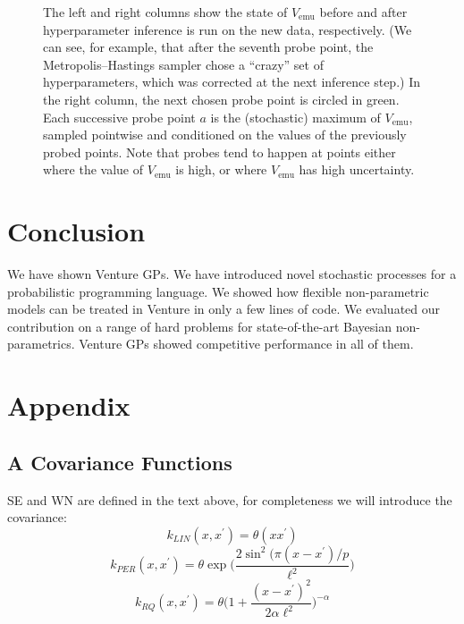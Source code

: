 \documentclass{article} %
\newcommand{\emu}{{\textrm{emu}}}
\begin{document}
\begin{figure}
{      The left and right columns show the state of $V_\emu$ before and after hyperparameter inference is run on the new data, respectively.
      (We can see, for example, that after the seventh probe point, the Metropolis--Hastings sampler chose a ``crazy'' set of hyperparameters, which was corrected at the next inference step.)
      In the right column, the next chosen probe point is circled in green.
      Each successive probe point $a$ is the (stochastic) maximum of $V_\emu$, sampled pointwise and conditioned on the values of the previously probed points.
      Note that probes tend to happen at points either where the value of $V_\emu$ is high, or where $V_\emu$ has high uncertainty.
      }
    \label{fig:bayesopt-sequence}
\end{figure}




\FloatBarrier
\section{Conclusion}
We have shown Venture GPs. We have introduced novel stochastic processes for a probabilistic programming language. We showed how flexible non-parametric models can be treated in Venture in only a few lines of code. We evaluated our contribution on a range of hard problems for state-of-the-art Bayesian non-parametrics. Venture GPs showed competitive performance in all of them. 

\section*{Appendix}
\subsection*{A Covariance Functions}
SE and WN are defined in the text above, for completeness we will introduce the covariance:
\begin{equation}
k_{LIN}(x,x^\prime) = \theta (x x^\prime) 
\end{equation}
\begin{equation}
k_{PER}(x,x^\prime) = \theta \exp \bigg( \frac{2 \sin^2 ( \pi (x - x^\prime)/p}{\ell^2} \bigg) 
\end{equation}
\begin{equation}
k_{RQ}(x,x^\prime) =   \theta \bigg(1 + \frac{(x - x^\prime)^2}{2 \alpha \ell^2} \bigg)^{-\alpha}
\end{equation}
\end{document}
